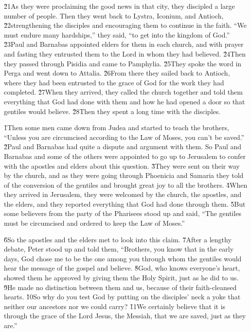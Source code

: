 \v{21}As they were proclaiming the good news in that city, they discipled a large number of people. Then they went back to Lystra, Iconium, and Antioch, \v{22}strengthening the disciples and encouraging them to continue in the faith. ``We must endure many hardships,'' they said, ``to get into the kingdom of God.'' \v{23}Paul and Barnabas appointed elders for them in each church, and with prayer and fasting they entrusted them to the Lord in whom they had believed. \v{24}Then they passed through Pisidia and came to Pamphylia. \v{25}They spoke the word in Perga and went down to Attalia. \v{26}From there they sailed back to Antioch, where they had been entrusted to the grace of God for the work they had completed. \v{27}When they arrived, they called the church together and told them everything that God had done with them and how he had opened a door so that gentiles would believe. \v{28}Then they spent a long time with the disciples.

\v{1}Then some men came down from Judea and started to teach the brothers, ``Unless you are circumcised according to the Law of Moses, you can't be saved.'' \v{2}Paul and Barnabas had quite a dispute and argument with them. So Paul and Barnabas and some of the others were appointed to go up to Jerusalem to confer with the apostles and elders about this question. \v{3}They were sent on their way by the church, and as they were going through Phoenicia and Samaria they told of the conversion of the gentiles and brought great joy to all the brothers. \v{4}When they arrived in Jerusalem, they were welcomed by the church, the apostles, and the elders, and they reported everything that God had done through them. \v{5}But some believers from the party of the Pharisees stood up and said, ``The gentiles must be circumcised and ordered to keep the Law of Moses.''

\v{6}So the apostles and the elders met to look into this claim. \v{7}After a lengthy debate, Peter stood up and told them, ``Brothers, you know that in the early days, God chose me to be the one among you through whom the gentiles would hear the message of the gospel and believe. \v{8}God, who knows everyone's heart, showed them he approved by giving them the Holy Spirit, just as he did to us. \v{9}He made no distinction between them and us, because of their faith-cleansed hearts. \v{10}So why do you test God by putting on the disciples' neck a yoke that neither our ancestors nor we could carry? \v{11}We certainly believe that it is through the grace of the Lord Jesus, the Messiah, that we are saved, just as they are.''


